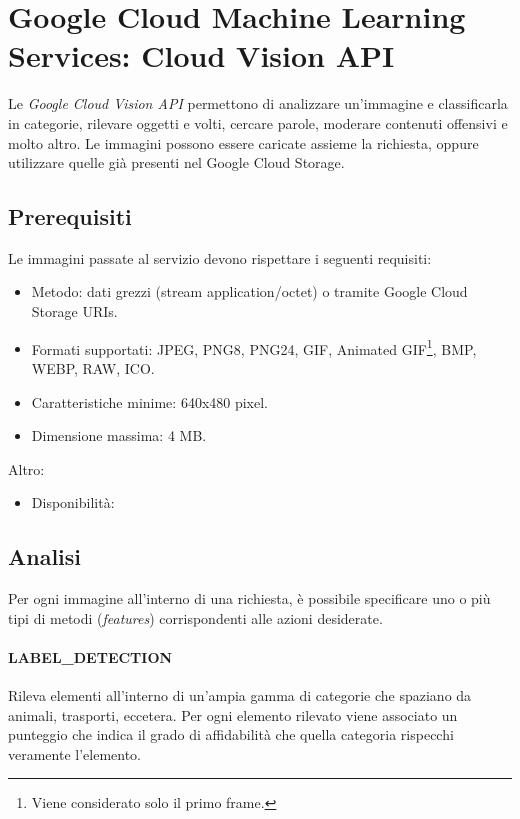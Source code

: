 \section{Google Cloud Machine Learning Services: Cloud Vision API}
Le \textit{Google Cloud Vision API} \cite{google-api} permettono di analizzare un'immagine e classificarla in categorie, rilevare oggetti e volti, cercare parole,
moderare contenuti offensivi e molto altro. Le immagini possono essere caricate assieme la richiesta, oppure utilizzare quelle già presenti nel Google Cloud Storage. 

\subsection{Prerequisiti}
Le immagini passate al servizio devono rispettare i seguenti requisiti:
\begin{itemize}
\item Metodo: dati grezzi (stream application/octet) o tramite Google Cloud Storage URIs.
\item Formati supportati: JPEG, PNG8, PNG24, GIF, Animated GIF\footnote{Viene considerato solo il primo frame.},
BMP, WEBP, RAW, ICO.
\item Caratteristiche minime: 640x480 pixel. 
\item Dimensione massima: 4 MB.
\end{itemize}
Altro:
\begin{itemize}
\item Disponibilità: %
\end{itemize}

\subsection{Analisi}
Per ogni immagine all'interno di una richiesta, è possibile specificare uno o più tipi di metodi (\textit{features}) corrispondenti alle azioni desiderate.
\paragraph{\textsf{LABEL\_DETECTION}} Rileva elementi all'interno di un'ampia gamma di categorie che spaziano da animali, trasporti, eccetera.
Per ogni elemento rilevato viene associato un punteggio che indica il grado di affidabilità che quella categoria rispecchi veramente l'elemento.
